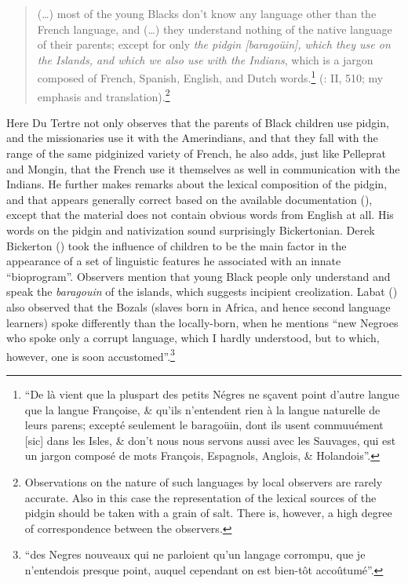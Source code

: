 \documentclass[output=paper,colorlinks,citecolor=brown]{langscibook}
\begin{document}
\largerpage
\begin{quote}
(…) most of the young Blacks don’t know any language other than the French language, and (…) they understand nothing of the native language of their parents; except for only \textit{the pidgin [barago}\textit{ü}\textit{in], which they use on the Islands, and which we also use with the Indians}, which is a jargon composed of French, Spanish, English, and Dutch words.\footnote{“De là vient que la pluspart des petits Négres ne sçavent point d’autre langue que la langue Françoise, \& qu’ils n’entendent rien à la langue naturelle de leurs parens; excepté seulement le baragoüin, dont ils usent commuuément [sic] dans les Isles, \& don’t nous nous servons aussi avec les Sauvages, qui est un jargon composé de mots François, Espagnols, Anglois, \& Holandois”.}
 (\citealt{DuTertre1667}: II, 510; my emphasis and translation).\footnote{Observations on the nature of such languages by local observers are rarely accurate. Also in this case the representation of the lexical sources of the pidgin should be taken with a grain of salt. There is, however, a high degree of correspondence between the observers.}
\end{quote}
\clearpage

Here Du Tertre not only observes that the parents of Black children use pidgin, and the missionaries use it with the Amerindians, and that they fall with the range of the same pidginized variety of French, he also adds, just like Pelleprat and Mongin, that the French use it themselves as well in communication with the Indians. He further makes remarks about the lexical composition of the pidgin, and that appears generally correct based on the available documentation (\citealt{Bakker2022}), except that the material does not contain obvious words from English at all. His words on the pidgin and nativization sound surprisingly Bickertonian. Derek Bickerton (\citeyear{Bickerton1981,Bickerton1984}) took the influence of children to be the main factor in the appearance of a set of linguistic features he associated with an innate “bioprogram”. Observers mention that young Black people only understand and speak the \textit{baragouin} of the islands, which suggests incipient creolization. Labat (\citeyear[98]{Labat1724_tome1}) also observed that the Bozals (slaves born in Africa, and hence second language learners) spoke differently than the locally-born, when he mentions “new Negroes who spoke only a corrupt language, which I hardly understood, but to which, however, one is soon accustomed”.\footnote{“des Negres nouveaux qui ne parloient qu’un langage corrompu, que je n’entendois presque point, auquel cependant on est bien-t\^{o}t accoûtum\'e”.}
\end{document}
